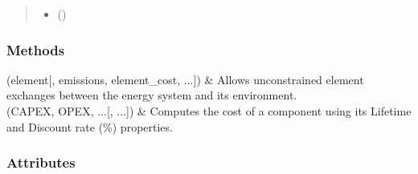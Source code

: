 \documentclass[letterpaper,10pt,english]{sphinxmanual}
\begin{document}
\begin{fulllineitems}
\begin{fulllineitems}
\begin{quote}
\begin{description}
\begin{itemize}
\item {} 
\sphinxAtStartPar
{} (\sphinxstyleliteralemphasis{\sphinxupquote{, }}) \textendash{} 

\end{itemize}

\end{description}\end{quote}

\end{fulllineitems}

\subsubsection*{Methods}


\begin{savenotes}\sphinxattablestart
\centering
\begin{tabulary}{\linewidth}[t]{}
\hline

\sphinxAtStartPar
{\hyperref[\detokenize{generated/tamos.elementIO.Grid:tamos.elementIO.Grid.__init__}]{}}(element{[}, emissions, element\_cost, ...{]})
&
\sphinxAtStartPar
Allows unconstrained element exchanges between the energy system and its environment.
\\
\hline
\sphinxAtStartPar
{\hyperref[\detokenize{generated/tamos.elementIO.Grid:tamos.elementIO.Grid.compute_actualized_cost}]{}}(CAPEX, OPEX, ...{[}, ...{]})
&
\sphinxAtStartPar
Computes the cost of a component using its \textquotesingle{}Lifetime\textquotesingle{} and \textquotesingle{}Discount rate (\%)\textquotesingle{} properties.
\\
\hline
\end{tabulary}
\par
\sphinxattableend\end{savenotes}
\subsubsection*{Attributes}


\begin{savenotes}\sphinxattablestart
\centering
\begin{tabulary}{\linewidth}[t]{}
\hline


\end{tabulary}
\end{savenotes}
\end{fulllineitems}
\end{document}
